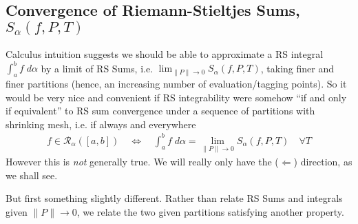 \documentclass[12pt]{book}
\numberwithin{equation}{section} %
\theoremstyle{plain}
\theoremstyle{definition}
\theoremstyle{remark}
\newcommand{\ra}{\rightarrow}
\newcommand{\sR}{\mathscr{R}}
\begin{document}
\newpage
\subsection{Convergence of Riemann-Stieltjes Sums, $S_\alpha(f,P,T)$}

Calculus intuition suggests we should be able to approximate a RS
integral $\int^b_af\; d\alpha$ by a limit of RS Sums, i.e.
$\lim_{\lVert P\rVert\ra 0} S_\alpha(f,P,T)$,
taking finer and finer partitions (hence, an increasing number of
evaluation/tagging points). So it would be very nice and convenient if
RS integrability were somehow ``if and only if equivalent'' to RS sum
convergence under a sequence of partitions with shrinking mesh, i.e.
if always and everywhere
\begin{align*}
  f\in\sR_\alpha([a,b])
  \quad\iff\quad
  \int^b_a f\; d\alpha = \lim_{\lVert P \rVert\ra 0} S_\alpha(f,P,T)
  \quad \forall T
\end{align*}
However this is \emph{not} generally true. We will really only have
the ($\Leftarrow$) direction, as we shall see.

But first something slightly different.
Rather than relate RS Sums and integrals given $\lVert P\rVert\ra 0$,
we relate the two given partitions satisfying another property.
\end{document}
